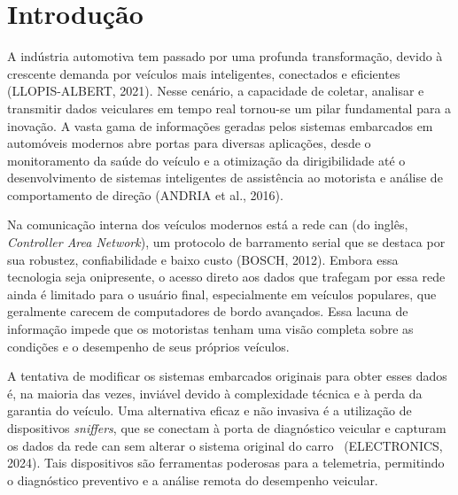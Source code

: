 \documentclass[a4paper, 12pt]{article}
\begin{document}
\pagestyle{plain} 

\setcounter{page}{1}

\glsresetall
\section{Introdução}

A indústria automotiva tem passado por uma profunda transformação, devido à crescente demanda por veículos mais inteligentes, conectados e eficientes (LLOPIS-ALBERT, 2021). Nesse cenário, a capacidade de coletar, analisar e transmitir dados veiculares em tempo real tornou-se um pilar fundamental para a inovação. A vasta gama de informações geradas pelos sistemas embarcados em automóveis modernos abre portas para diversas aplicações, desde o monitoramento da saúde do veículo e a otimização da dirigibilidade até o desenvolvimento de sistemas inteligentes de assistência ao motorista e análise de comportamento de direção (ANDRIA et al., 2016).

Na comunicação interna dos veículos modernos está a rede \acrshort{can} (do inglês, \textit{Controller Area Network}), um protocolo de barramento serial que se destaca por sua robustez, confiabilidade e baixo custo (BOSCH, 2012). Embora essa tecnologia seja onipresente, o acesso direto aos dados que trafegam por essa rede ainda é limitado para o usuário final, especialmente em veículos populares, que geralmente carecem de computadores de bordo avançados. Essa lacuna de informação impede que os motoristas tenham uma visão completa sobre as condições e o desempenho de seus próprios veículos.

A tentativa de modificar os sistemas embarcados originais para obter esses dados é, na maioria das vezes, inviável devido à complexidade técnica e à perda da garantia do veículo. Uma alternativa eficaz e não invasiva é a utilização de dispositivos \textit{sniffers}, que se conectam à porta de diagnóstico veicular e capturam os dados da rede \acrshort{can} sem alterar o sistema original do carro  (ELECTRONICS, 2024). Tais dispositivos são ferramentas poderosas para a telemetria, permitindo o diagnóstico preventivo e a análise remota do desempenho veicular.
\end{document}
